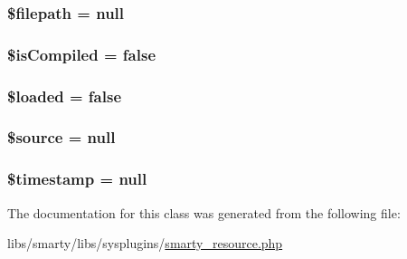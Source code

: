 \subsubsection[{\$filepath}]{\setlength{\rightskip}{0pt plus 5cm}\$filepath = null}\label{class_smarty___template___compiled_a3bce02156476bcca5e7573793b12226c}
\hypertarget{class_smarty___template___compiled_afebec6bcbbd03a1e85eb35f1aa4f9b49}{}
\subsubsection[{\$is\+Compiled}]{\setlength{\rightskip}{0pt plus 5cm}\$is\+Compiled = false}\label{class_smarty___template___compiled_afebec6bcbbd03a1e85eb35f1aa4f9b49}
\hypertarget{class_smarty___template___compiled_a3b5a1179b24abbc9be2a18eeda5ba297}{}
\subsubsection[{\$loaded}]{\setlength{\rightskip}{0pt plus 5cm}\$loaded = false}\label{class_smarty___template___compiled_a3b5a1179b24abbc9be2a18eeda5ba297}
\hypertarget{class_smarty___template___compiled_a99a2b085f0a29bd5d799fdcbb63d261b}{}
\subsubsection[{\$source}]{\setlength{\rightskip}{0pt plus 5cm}\$source = null}\label{class_smarty___template___compiled_a99a2b085f0a29bd5d799fdcbb63d261b}
\hypertarget{class_smarty___template___compiled_a2b69de9676dd97c675cd4d9bcceb684c}{}
\subsubsection[{\$timestamp}]{\setlength{\rightskip}{0pt plus 5cm}\$timestamp = null}\label{class_smarty___template___compiled_a2b69de9676dd97c675cd4d9bcceb684c}


The documentation for this class was generated from the following file\+:\begin{DoxyCompactItemize}
\item 
libs/smarty/libs/sysplugins/\hyperlink{smarty__resource_8php}{smarty\+\_\+resource.\+php}\end{DoxyCompactItemize}
